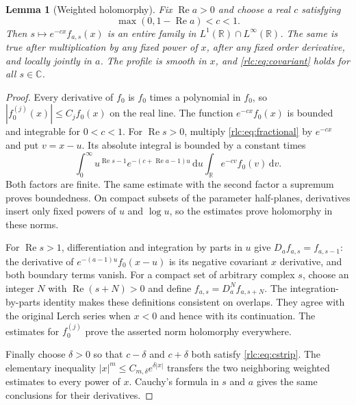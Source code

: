 \documentclass[11pt,a4paper]{article}
\numberwithin{equation}{section}
\newtheorem{lemma}[theorem]{Lemma}
\theoremstyle{definition}\newtheorem{definition}[theorem]{Definition}
\theoremstyle{remark}\newtheorem{remark}[theorem]{Remark}
\DeclareMathOperator{\Rea}{Re}
\newcommand{\dd}{\,\mathrm d}
\newcommand{\C}{\mathbb C}\newcommand{\R}{\mathbb R}\newcommand{\N}{\mathbb N}
\begin{document}
\begin{lemma}[Weighted holomorphy]\label{rlc:lem:weighted}
Fix $\Rea a>0$ and choose a real $c$ satisfying
\begin{equation}\label{rlc:eq:cstrip}
 \max(0,1-\Rea a)<c<1.
\end{equation}
Then $s\mapsto e^{-cx}f_{a,s}(x)$ is an entire family in
$L^1(\R)\cap L^\infty(\R)$. The same is true after multiplication by
any fixed power of $x$, after any fixed order derivative, and locally
jointly in $a$. The profile is smooth in $x$, and
\eqref{rlc:eq:covariant} holds for all $s\in\C$.
\end{lemma}
\begin{proof}
Every derivative of $f_0$ is $f_0$ times a polynomial in $f_0$, so
$|f_0^{(j)}(x)|\le C_j f_0(x)$ on the real line. The function
$e^{-cx}f_0(x)$ is bounded and integrable for $0<c<1$.
For $\Rea s>0$, multiply \eqref{rlc:eq:fractional} by $e^{-cx}$ and
put $v=x-u$. Its absolute integral is bounded by a constant times
\[
 \int_0^\infty u^{\Rea s-1}
 e^{-(c+\Rea a-1)u}\dd u
 \int_\R e^{-cv}f_0(v)\dd v.
\]
Both factors are finite. The same estimate with the second factor a
supremum proves boundedness. On compact subsets of the parameter
half-planes, derivatives insert only fixed powers of $u$ and $\log u$,
so the estimates prove holomorphy in these norms.

For $\Rea s>1$, differentiation and integration by parts in $u$ give
$D_a f_{a,s}=f_{a,s-1}$: the derivative of
$e^{-(a-1)u}f_0(x-u)$ is its negative covariant $x$ derivative, and
both boundary terms vanish. For a compact set of arbitrary complex
$s$, choose an integer $N$ with $\Rea(s+N)>0$ and define
$f_{a,s}=D_a^Nf_{a,s+N}$. The integration-by-parts identity makes these
definitions consistent on overlaps. They agree with the original Lerch
series when $x<0$ and hence with its continuation. The estimates for
$f_0^{(j)}$ prove the asserted norm holomorphy everywhere.

Finally choose $\delta>0$ so that $c-\delta$ and $c+\delta$ both satisfy
\eqref{rlc:eq:cstrip}. The elementary inequality
$|x|^m\le C_{m,\delta}e^{\delta|x|}$ transfers the two neighboring
weighted estimates to every power of $x$. Cauchy's formula in $s$ and
$a$ gives the same conclusions for their derivatives.
\end{proof}
\end{document}
